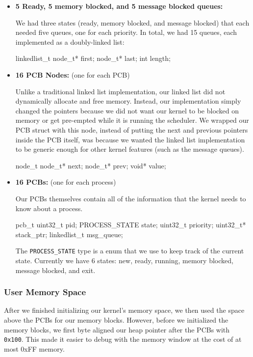 \documentclass[se]{uw-wkrpt}
\begin{document}
\begin{itemize}
	\item \textbf{5 Ready, 5 memory blocked, and 5 message blocked queues:} 
	
	We had three states (ready, memory blocked, and message blocked) that each needed five queues, one for each priority. In total, we had 15 queues, each implemented as a doubly-linked list:
	\begin{code}
linkedlist_t
    node_t* first;
    node_t* last;
    int length;
	\end{code}
	
	\item \textbf{16 PCB Nodes:} (one for each PCB)
	
	Unlike a traditional linked list implementation, our linked list did not dynamically allocate and free memory. Instead, our implementation simply changed the pointers because we did not want our kernel to be blocked on memory or get pre-empted while it is running the scheduler. We wrapped our PCB struct with this node, instead of putting the next and previous pointers inside the PCB itself, was because we wanted the linked list implementation to be generic enough for other kernel features (such as the message queues).
	\begin{code}
node_t
    node_t* next;
    node_t* prev;
    void* value;
	\end{code}
	
	\item \textbf{16 PCBs:} (one for each process)
	
	Our PCBs themselves contain all of the information that the kernel needs to know about a process.
	\begin{code}
pcb_t
    uint32_t pid;
    PROCESS_STATE state;
    uint32_t priority;
    uint32_t* stack_ptr;
    linkedlist_t msg_queue;
	\end{code}
	
	The \texttt{PROCESS\_STATE} type is a enum that we use to keep track of the current state. Currently we have 6 states: new, ready, running, memory blocked, message blocked, and exit. 
	
\end{itemize}

\subsubsection{User Memory Space}
After we finished initializing our kernel's memory space, we then used the space above the PCBs for our memory blocks. However, before we initialized the memory blocks, we first byte aligned our heap pointer after the PCBs with \texttt{0x100}. This made it easier to debug with the memory window at the cost of at most 0xFF memory.
\end{document}
